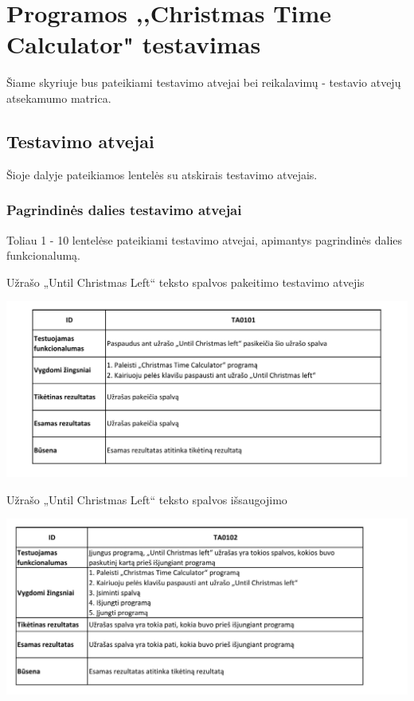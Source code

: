 \documentclass{VUMIFPSkursinis}
\begin{document}
	\section{Programos ,,Christmas Time Calculator" testavimas} \label{testavimas}
		Šiame skyriuje bus pateikiami testavimo atvejai bei reikalavimų - testavio atvejų atsekamumo matrica.
		\subsection{Testavimo atvejai} \label{testavimoAtvejai}
			Šioje dalyje pateikiamos lentelės su atskirais testavimo atvejais.
			\subsubsection{Pagrindinės dalies testavimo atvejai} \label{pagrindinesDaliesTA}
				Toliau 1 - 10 lentelėse pateikiami testavimo atvejai, apimantys pagrindinės dalies funkcionalumą.
				\begin{table}[H]
					\centering
					\caption{Užrašo „Until Christmas Left“ teksto spalvos pakeitimo testavimo atvejis}
					\includegraphics[width=\textwidth]{TA/TA0101}			
					\label{fig:TA0101}
				\end{table}
				\begin{table}[H]
					\centering
					\caption{Užrašo „Until Christmas Left“ teksto spalvos išsaugojimo}
					\includegraphics[width=\textwidth]{TA/TA0102}			
					\label{fig:TA0102}
				\end{table}
\end{document}
